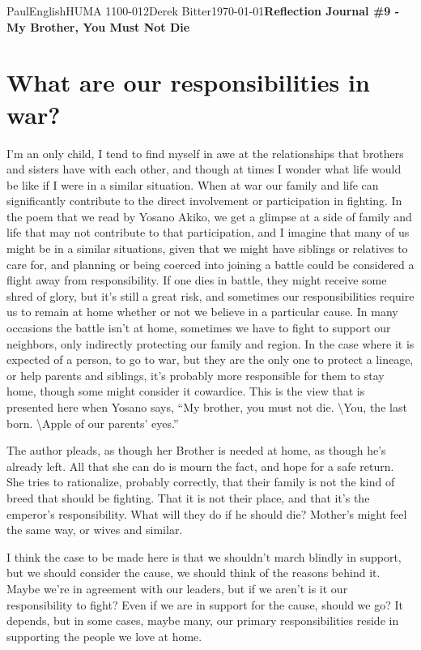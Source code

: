 \documentclass[12pt,letterpaper]{article}
\begin{document}
\begin{mla}{Paul}{English}{HUMA 1100-012}{Derek
    Bitter}{\today}{\textbf{Reflection Journal \#9 - My Brother, You Must Not Die}}

\section*{What are our responsibilities in war?}

I'm an only child, I tend to find myself in awe at the relationships that brothers and sisters have with each other, and though at times I wonder what life would be like if I were in a similar situation. When at war our family and life can significantly contribute to the direct involvement or participation in fighting. In the poem that we read by Yosano Akiko, we get a glimpse at a side of family and life that may not contribute to that participation, and I imagine that many of us might be in a similar situations, given that we might have siblings or relatives to care for, and planning or being coerced into joining a battle could be considered a flight away from responsibility. If one dies in battle, they might receive some shred of glory, but it's still a great risk, and sometimes our responsibilities require us to remain at home whether or not we believe in a particular cause. In many occasions the battle isn't at home, sometimes we have to fight to support our neighbors, only indirectly protecting our family and region. In the case where it is expected of a person, to go to war, but they are the only one to protect a lineage, or help parents and siblings, it's probably more responsible for them to stay home, though some might consider it cowardice. This is the view that is presented here when Yosano says, ``My brother, you must not die. \textbackslash You, the last born. \textbackslash Apple of our parents' eyes.''

The author pleads, as though her Brother is needed at home, as though he's already left. All that she can do is mourn the fact, and hope for a safe return. She tries to rationalize, probably correctly, that their family is not the kind of breed that should be fighting. That it is not their place, and that it's the emperor's responsibility. What will they do if he should die? Mother's might feel the same way, or wives and similar.

I think the case to be made here is that we shouldn't march blindly in support, but we should consider the cause, we should think of the reasons behind it. Maybe we're in agreement with our leaders, but if we aren't is it our responsibility to fight? Even if we are in support for the cause, should we go? It depends, but in some cases, maybe many, our primary responsibilities reside in supporting the people we love at home.

\end{mla}
\end{document}
